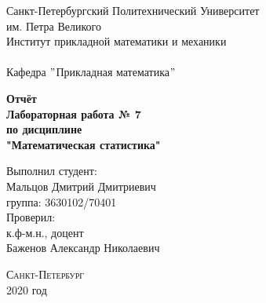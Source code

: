 \documentclass[a4]{article}
\renewcommand{\listoftables}{\begingroup %
\tocsection
\tocfile{\listtablename}{lot}
\endgroup}
\begin{document}



\def\contentsname{\LARGE{Содержание}}
\thispagestyle{empty}
\begin{center} 
	\vspace{2cm} 
	{\Large \sc Санкт-Петербургский Политехнический Университет}\\
	\vspace{2mm}
	{\Large\sc им. Петра Великого}\\
	\vspace{1cm}
	{\large \sc Институт прикладной математики и механики\\ 
		\vspace{0.5mm}
		\textsc{}}\\ 
	\vspace{0.5mm}
	{\large\sc Кафедра $"$Прикладная математика$"$}\\
	\vspace{15mm}
	
	
	{\sc \textbf{Отчёт\\
			Лабораторная работа № 7\\
			по дисциплине\\
			"Математическая статистика"}
		\vspace{6mm}
		
	}
	\vspace*{2mm}
	
	
	\begin{flushleft}
		\vspace{4cm}
		\sc Выполнил студент:\\
		\sc Мальцов Дмитрий Дмитриевич\\
		\sc группа: 3630102/70401\\
		\vspace{1cm}
		\sc Проверил:\\
		\sc к.ф-м.н., доцент\\
		\sc Баженов Александр Николаевич
		\vspace{20mm}
	\end{flushleft}
\end{center} 
\begin{center}
	\vfill {\large\textsc{Санкт-Петербург}}\\ 
	2020 год
\end{center}

\newpage
\pagestyle{plain}



\newpage
\tableofcontents{}
\newpage
\listoftables{}
\newpage
\end{document}
